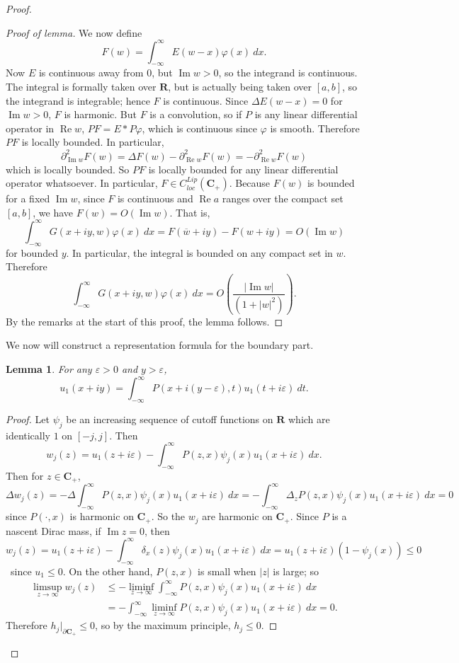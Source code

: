 \documentclass[12pt]{report}
\newcommand{\RR}{\mathbf{R}}
\newcommand{\CC}{\mathbf{C}}
\renewcommand{\Re}{\operatorname{Re}}
\renewcommand{\Im}{\operatorname{Im}}
\newtheorem{lemma}[theorem]{Lemma}
\theoremstyle{definition}
\theoremstyle{remark}
\begin{document}
\begin{proof}
\begin{proof}[Proof of lemma]
    We now define
$$F(w) = \int_{-\infty}^\infty E(w - x)\varphi(x) ~dx.$$
    Now $E$ is continuous away from $0$, but $\Im w > 0$, so the integrand is continuous. The integral is formally taken over $\RR$, but is actually being taken over $[a, b]$, so the integrand is integrable; hence $F$ is continuous. Since $\Delta E(w - x) = 0$ for $\Im w > 0$, $F$ is harmonic. But $F$ is a convolution, so if $P$ is any linear differential operator in $\Re w$, $PF = E * P\varphi$, which is continuous since $\varphi$ is smooth. Therefore $PF$ is locally bounded. In particular,
$$\partial_{\Im w}^2 F(w) = \Delta F(w) - \partial_{\Re w}^2 F(w) = -\partial_{\Re w}^2 F(w)$$
    which is locally bounded. So $PF$ is locally bounded for any linear differential operator whatsoever. In particular, $F \in C^{Lip}_{loc}(\CC_+)$. Because $F(w)$ is bounded for a fixed $\Im w$, since $F$ is continuous and $\Re a$ ranges over the compact set $[a, b]$, we have $F(w) = O(\Im w)$. That is,
$$\int_{-\infty}^\infty G(x + iy, w) \varphi(x) ~dx = F(\overline w + iy) - F(w + iy) = O(\Im w)$$
    for bounded $y$. In particular, the integral is bounded on any compact set in $w$. Therefore
$$\int_{-\infty}^\infty G(x + iy, w) \varphi(x) ~dx = O\left(\frac{|\Im w|}{(1 + |w|^2)}\right).$$
    By the remarks at the start of this proof, the lemma follows.
\end{proof}
    We now will construct a representation formula for the boundary part.
\begin{lemma}
  \label{approximate sigma rep}
    For any $\varepsilon > 0$ and $y > \varepsilon$,
$$u_1(x + iy) = \int_{-\infty}^\infty P(x + i(y-\varepsilon), t) u_1(t + i\varepsilon) ~dt.$$
\end{lemma}
\begin{proof}
    Let $\psi_j$ be an increasing sequence of cutoff functions on $\RR$ which are identically $1$ on $[-j, j]$. Then
$$w_j(z) = u_1(z + i\varepsilon) - \int_{-\infty}^\infty P(z, x)\psi_j(x)u_1(x + i\varepsilon) ~dx.$$
    Then for $z \in \CC_+$,
$$\Delta w_j(z) = -\Delta \int_{-\infty}^\infty P(z, x)\psi_j(x) u_1(x + i\varepsilon) ~dx = -\int_{-\infty}^\infty \Delta_z P(z, x) \psi_j(x) u_1(x + i\varepsilon) ~dx = 0$$
    since $P(\cdot, x)$ is harmonic on $\CC_+$. So the $w_j$ are harmonic on $\CC_+$. Since $P$ is a nascent Dirac mass, if $\Im z = 0$, then
$$w_j(z) = u_1(z + i\varepsilon) - \int_{-\infty}^\infty \delta_x(z) \psi_j(x) u_1(x + i\varepsilon) ~dx = u_1(z + i\varepsilon)(1 - \psi_j(x)) \leq 0$$\
    since $u_1 \leq 0$. On the other hand, $P(z, x)$ is small when $|z|$ is large; so
    \begin{align*}\limsup_{z \to \infty} w_j(z) &\leq -\liminf_{z \to \infty} \int_{-\infty}^\infty P(z, x) \psi_j(x) u_1(x + i\varepsilon) ~dx
      \\&= -\int_{-\infty}^\infty \liminf_{z \to \infty} P(z, x) \psi_j(x) u_1(x + i\varepsilon) ~dx = 0.\end{align*}
    Therefore $h_j|_{\partial \CC_+} \leq 0$, so by the maximum principle, $h_j \leq 0$.


\end{proof}
\end{proof}
\end{document}
